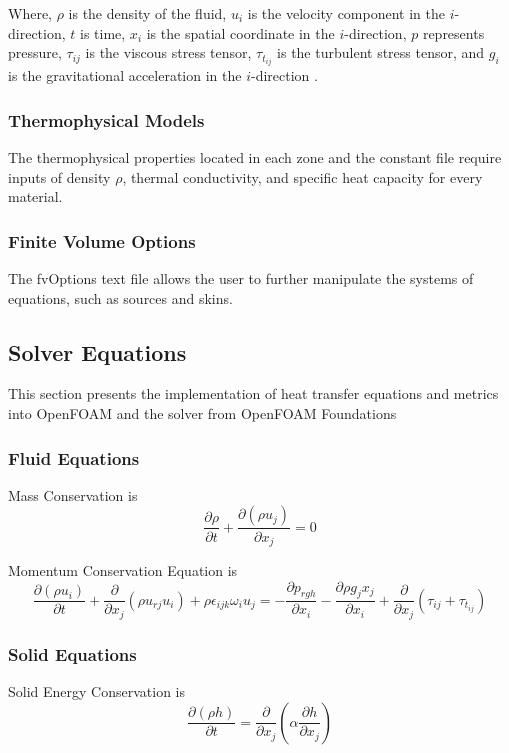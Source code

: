 Where, $\rho$ is the density of the fluid, $u_i$ is the velocity component in the $i$-direction, $t$ is time, $x_i$ is the spatial coordinate in the $i$-direction, $p$ represents pressure, $\tau_{ij}$ is the viscous stress tensor, $\tau_{t_{ij}}$ is the turbulent stress tensor, and $g_i$ is the gravitational acceleration in the $i$-direction
 \cite{cht}.


\subsubsection{Thermophysical Models}
The thermophysical properties located in each zone and the constant file require inputs of density $\rho$, thermal conductivity, and specific heat capacity for every material.
\subsubsection{Finite Volume Options}
The fvOptions text file allows the user to further manipulate the systems of equations, such as sources and skins. 

\subsection{Solver Equations}    
This section presents the implementation of heat transfer equations and metrics into OpenFOAM and the solver from OpenFOAM Foundations\cite{OpenFOAMFoundation}
\subsubsection{Fluid Equations}

      Mass Conservation is \begin{equation}
\frac{\partial \rho}{\partial t} + \frac{\partial (\rho u_j)}{\partial x_j} = 0
\end{equation}


      Momentum Conservation Equation is \begin{equation}
\frac{\partial (\rho u_i)}{\partial t} + \frac{\partial}{\partial x_j} \left( \rho u_{rj} u_i \right)  + \rho\epsilon_{ijk}\omega_i u_j = - \frac{\partial p_{rgh}}{\partial x_i} - \frac{\partial \rho g_j x_j}{\partial x_i}  + \frac{\partial}{\partial x_j} \left( \tau_{ij} + \tau_{t_{ij}} \right)
\end{equation}



\subsubsection{Solid Equations}
Solid Energy Conservation is \begin{equation}
\frac{\partial (\rho h)}{\partial t} = \frac{\partial}{\partial x_j}\left( \alpha \frac{\partial h}{\partial x_j} \right)
\end{equation}

